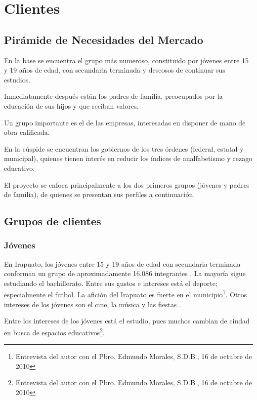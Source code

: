 \section{Clientes}
\label{sec:Clientes}

\subsection{Pirámide de Necesidades del Mercado}

En la base se encuentra el grupo más numeroso, constituido por jóvenes entre 15 y 19 años de edad, con secundaria terminada y deseosos de continuar sus estudios.

Inmediatamente después están los padres de familia, preocupados por la educación de sus hijos y que reciban valores.

Un grupo importante es el de las empresas, interesadas en disponer de mano de obra calificada.

En la cúspide se encuentran los gobiernos de los tres órdenes (federal, estatal y municipal), quienes tienen interés en reducir los índices de analfabetismo y rezago educativo.

El proyecto se enfoca principalmente a los dos primeros grupos (jóvenes y padres de familia), de quienes se presentan sus perfiles a continuación.

\subsection{Grupos de clientes}

\subsubsection{Jóvenes}

En Irapuato, los j\'ovenes entre 15 y 19 a\~nos de edad con secundaria terminada conforman un grupo de aproximadamente 16,086 integrantes \citep{Inegi2005}. La mayor\'{i}a sigue estudiando el bachillerato. Entre sus gustos e intereses est\'a el deporte; especialmente el futbol. La afici\'on del Irapuato es fuerte en el municipio\footnote{Entrevista del autor con el Pbro. Edmundo Morales, S.D.B., 16 de octubre de 2010}. Otros intereses de los j\'ovenes son el cine, la m\'usica y las fiestas \citep{Cordero07}.

Entre los intereses de los jóvenes está el estudio, pues muchos cambian de ciudad en busca de espacios educativos\footnote{Entrevista del autor con el Pbro. Edmundo Morales, S.D.B., 16 de octubre de 2010}.

